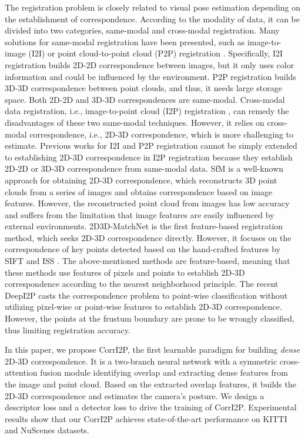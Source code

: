 \documentclass[lettersize,journal]{IEEEtran}
\begin{document}
The registration problem is closely related to visual pose estimation depending on the establishment of correspondence. According to the modality of data, it can be divided into two categories, same-modal and cross-modal registration. Many solutions for same-modal registration have been presented, such as image-to-image (I2I) \cite{I2I1,I2I2,I2I3,TCSVTI2I,TCSVTI2I2} or point cloud-to-point cloud (P2P) registration \cite{ICP,FGR,GOICP,3DMATCH,PERFECTMATCH,PREDATOR,DEEPI2P,DEEPICP,TCSVTP2P,TCSVTP2P2,TCSVTP2P3,CORRNET3D,feng2021recurrent}. Specifically, I2I registration builds 2D-2D correspondence between images, but it only uses color information and could be influenced by the environment. P2P registration builds 3D-3D correspondence between point clouds, and thus, it needs large storage space. Both 2D-2D and 3D-3D correspondences are same-modal. Cross-modal data registration, i.e., image-to-point cloud (I2P) registration \cite{2D3DMATCHNET,DEEPI2P}, can remedy the disadvantages of these two same-modal techniques. However, it relies on cross-modal correspondence, i.e., 2D-3D correspondence, which is more challenging to estimate.
Previous works for I2I and P2P registration cannot be simply extended to establishing 2D-3D correspondence in I2P registration because they establish 2D-2D or 3D-3D correspondence from same-modal data. SfM \cite{SFM} is a well-known approach for obtaining 2D-3D correspondence, which reconstructs 3D point clouds from a series of images and obtains correspondence based on image features. 
However, the reconstructed point cloud from images has low accuracy and suffers from the limitation that image features are easily influenced by external environments.
2D3D-MatchNet \cite{2D3DMATCHNET} is the first feature-based registration method, which seeks  2D-3D correspondence directly. However, it focuses on the correspondence of key points detected based on the hand-crafted features by SIFT \cite{SIFT} and ISS \cite{ISS}. The above-mentioned methods are feature-based, meaning that these methods use features of pixels and points to establish 2D-3D correspondence according to the nearest neighborhood principle. 
The recent DeepI2P \cite{DEEPI2P} casts the correspondence problem to point-wise classification without utilizing pixel-wise or point-wise features to establish 2D-3D correspondence. However, the points at the frustum boundary are prone to be wrongly classified, thus limiting registration accuracy.


In this paper, we propose CorrI2P, the first learnable paradigm for building \textit{dense} 2D-3D correspondence. It is a two-branch neural network with a symmetric cross-attention fusion module identifying overlap and extracting dense features from the image and point cloud. Based on the extracted overlap features, it builds the 2D-3D correspondence and estimates the camera's posture. We design a descriptor loss and a detector loss to drive the training of CorrI2P. Experimental results show that our CorrI2P achieves state-of-the-art performance on KITTI \cite{KITTI} and NuScenes \cite{NUSCENES} datasets. 
\end{document}
